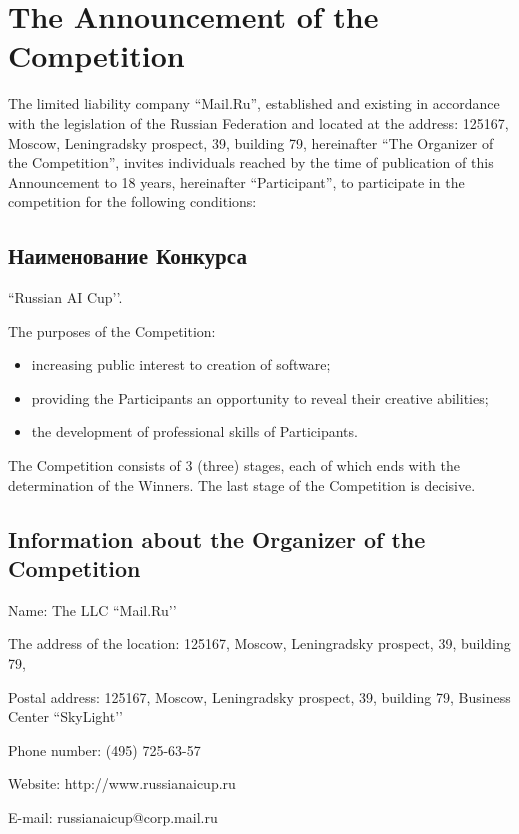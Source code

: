 \setlength{\parskip}{0.125in}

\chapter{The Announcement of the Competition}

The limited liability company ``Mail.Ru'', established and existing in accordance with the legislation of the Russian Federation 
and located at the address: 125167, Moscow, Leningradsky prospect, 39, building 79, hereinafter ``The Organizer of the Competition'',
invites individuals reached by the time of publication of this Announcement to 18 years, hereinafter ``Participant'',
to participate in the competition for the following conditions:

\section{Наименование Конкурса}

``Russian AI Cup’’.

The purposes of the Competition:
\begin{itemize}
\item increasing public interest to creation of software;
\item providing the Participants an opportunity to reveal their creative abilities;
\item the development of professional skills of Participants.
\end{itemize}

The Competition consists of 3 (three) stages, each of which ends with the determination of the Winners. The last stage of the Competition is decisive.

\section{Information about the Organizer of the Competition}

Name: The LLC ``Mail.Ru’’

The address of the location: 125167, Moscow, Leningradsky prospect, 39, building 79,

Postal address: 125167, Moscow, Leningradsky prospect, 39, building 79, Business Center ``SkyLight’’

Phone number: (495) 725-63-57

Website: http://www.russianaicup.ru

E-mail: russianaicup@corp.mail.ru

